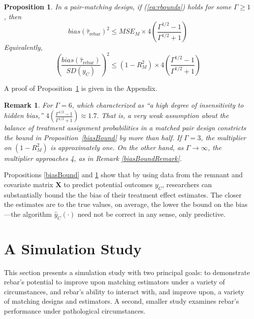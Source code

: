 \documentclass[12pt]{article}\usepackage[]{graphicx}\usepackage[]{color}
\newcommand{\est}{\hat{\tau}_{\text{rebar}}}
\newcommand{\Match}{M}
\newcommand{\algorithm}{\hat{y}_C(\cdot)}
\newcommand{\covMat}{\bm{X}}
\newtheorem{prop}{Proposition}
\newtheorem{remark}{Remark}
\begin{document}
\begin{prop}\label{prop:gammaBound}
  In a pair-matching design, if (\ref{eq:rbounds}) holds for some
  $\Gamma\ge 1$, then
  \begin{equation*}
    bias(\est)^2\le
    MSE_{\Match}\times 4\left(\frac{\Gamma^{1/2}-1}{\Gamma^{1/2}+1}\right)
  \end{equation*}
  Equivalently,
  \begin{equation*}
   \left(\frac{bias(\est)}{SD(y_C)}\right)^2\le(1-R^2_{\Match})\times 4\left(\frac{\Gamma^{1/2}-1}{\Gamma^{1/2}+1}\right)
   \end{equation*}
\end{prop}

A proof of Proposition~\ref{prop:gammaBound} is given in the Appendix.
\begin{remark}
  For $\Gamma=6$, which \citet[][p. 114]{rosenbaum:2002} characterized
  as ``a high degree of insensitivity to hidden bias,''
  $4\left(\frac{\Gamma^{1/2}-1}{\Gamma^{1/2}+1}\right)\approx 1.7.$
  That is, a very weak assumption about the balance of treatment
  assignment probabilities in a matched pair design constricts the
  bound in Proposition~\ref{biasBound} by more than half. If
  $\Gamma=3$, the multiplier on $(1-R^2_{\Match})$ is
  approximately one. On the other hand, as $\Gamma\rightarrow \infty$,
  the multiplier approaches 4, as in Remark \ref{biasBoundRemark}.
\end{remark}

Propositions \ref{biasBound} and \ref{prop:gammaBound} show that by using data from the remnant and covariate matrix $\covMat$ to predict potential outcomes $y_C$, researchers can substantially bound the the bias of their treatment effect estimates.
The closer the estimates are to the true values, on average, the lower the bound on the bias---the algorithm $\algorithm$ need not be correct in any sense, only predictive.


\section{A Simulation Study}\label{sec:sim}




This section presents a simulation study with two principal goals: to
demonstrate rebar's potential to improve upon matching
estimators under a variety of circumstances, and rebar's ability to
interact with, and improve upon, a variety of matching designs and
estimators.
A second, smaller study examines rebar's performance under
pathological circumstances.
\end{document}
